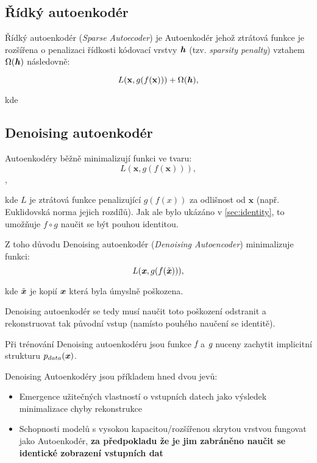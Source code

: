 \subsection{Řídký autoenkodér}
Řídký autoenkodér (\emph{Sparse Autoecoder}) je Autoenkodér jehož ztrátová funkce je rozšířena o penalizaci řídkosti kódovací vrstvy $\textbf{\emph{h}}$ (tzv. \emph{sparsity penalty}) vztahem $\Omega(\textbf{\emph{h}})$ následovně:

\begin{equation}
    L(\mathbf{x}, g(f(\mathbf{x}))) + \Omega(\textbf{\emph{h}}),
\end{equation}

kde 

\subsection{Denoising autoenkodér}
Autoenkodéry běžně minimalizují funkci ve tvaru:
\begin{equation}
    L(\mathbf{x}, g(f(\mathbf{x}))),
\end{equation},

kde $L$ je ztrátová funkce penalizující $g(f(x))$ za odlišnost od $\mathbf{x}$ (např. Euklidovská norma jejich rozdílů).
Jak ale bylo ukázáno v \autoref{sec:identity}, to umožňuje $f \circ g$ naučit se být pouhou identitou.


Z toho důvodu Denoising autoenkodér (\emph{Denoising Autoencoder}) minimalizuje funkci:
\begin{equation}
    L(\textbf{\emph{x}}, g(f(\tilde{\textbf{\emph{x}}}))),
\end{equation}

kde $\tilde{\textbf{\emph{x}}}$ je kopií $\textbf{\emph{x}}$ která byla úmyslně poškozena.

Denoising autoenkodér se tedy musí naučit toto poškození odstranit a rekonstruovat tak původní vstup (namísto pouhého naučení se identitě).

Při trénování Denoising autoenkodéru jsou funkce $\emph{f}$ a $\emph{g}$ nuceny zachytit implicitní strukturu $p_{data}(\textbf{\emph{x}})$.

Denoising Autoenkodéry jsou příkladem hned dvou jevů:
\begin{itemize}
    \item Emergence užitečných vlastností o vstupních datech jako výsledek minimalizace chyby rekonstrukce
    \item Schopnosti modelů s vysokou kapacitou/rozšířenou skrytou vrstvou fungovat jako Autoenkodér, \textbf{za předpokladu že je jim zabráněno naučit se identické zobrazení vstupních dat}
\end{itemize}

